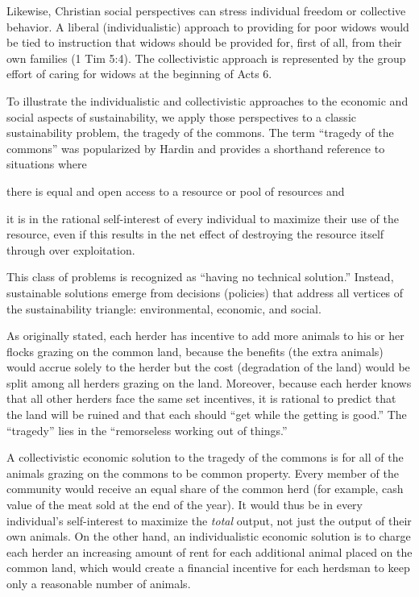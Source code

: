 \documentclass[12pt]{article}
\begin{document}
Likewise, Christian social perspectives can stress individual freedom or collective behavior.
A liberal (individualistic) approach to providing for poor widows 
would be tied to instruction that widows should be 
provided for, first of all, from their own families (1 Tim 5:4). 
The collectivistic approach is represented by the group effort of caring for widows 
at the beginning of Acts 6.

To illustrate the individualistic and collectivistic approaches to the economic and social 
aspects of sustainability, 
we apply those perspectives to a classic sustainability problem, 
the tragedy of the commons. 
The term ``tragedy of the commons'' was popularized by Hardin \autocite{Hardin68} 
and provides a shorthand reference to situations where 
%
\begin{enumerate*}[label={(\alph*)}]

  \item there is equal and open access to a resource or pool of resources and

  \item it is in the rational self-interest of
		every individual to maximize their use of the resource, even if this results in the net effect of destroying the
		resource itself through over exploitation.

\end{enumerate*}
% 
This class of problems is recognized as ``having no technical solution.''
Instead, sustainable solutions emerge from decisions (policies) 
that address all vertices of the sustainability triangle:
environmental, economic, and social.

As originally stated, each herder has incentive 
to add more animals to his or her flocks grazing on the common land, because
the benefits (the extra animals) would accrue solely to the herder
but the cost (degradation of the land) 
would be split among all herders grazing on the land. 
Moreover, because each herder knows that all other herders face the same set incentives, 
it is rational to predict that the land will be ruined
and that each should ``get while the getting is good.''
The ``tragedy'' lies in the ``remorseless working out of things.''

A collectivistic economic solution to the tragedy of the commons 
is for all of the animals grazing on the commons to be common property. 
Every member of the community would receive an equal share of the common herd 
(for example, cash value of the meat sold at the end of the year). 
It would thus be in every individual's self-interest 
to maximize the \emph{total} output, 
not just the output of their own animals. 
On the other hand, 
an individualistic economic solution is to charge each herder an increasing amount of rent 
for each additional animal placed on the common land, 
which would create a financial incentive for each herdsman to keep
only a reasonable number of animals. 
\end{document}

